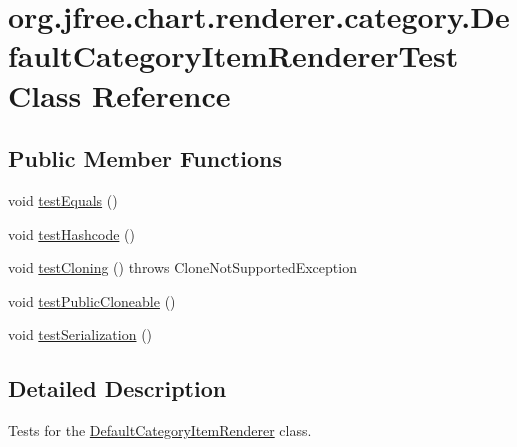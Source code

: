 \hypertarget{classorg_1_1jfree_1_1chart_1_1renderer_1_1category_1_1_default_category_item_renderer_test}{}\section{org.\+jfree.\+chart.\+renderer.\+category.\+Default\+Category\+Item\+Renderer\+Test Class Reference}
\label{classorg_1_1jfree_1_1chart_1_1renderer_1_1category_1_1_default_category_item_renderer_test}
\subsection*{Public Member Functions}
\begin{DoxyCompactItemize}
\item 
void \mbox{\hyperlink{classorg_1_1jfree_1_1chart_1_1renderer_1_1category_1_1_default_category_item_renderer_test_acaabec034fa906c7d3f5dd6e097b3b64}{test\+Equals}} ()
\item 
void \mbox{\hyperlink{classorg_1_1jfree_1_1chart_1_1renderer_1_1category_1_1_default_category_item_renderer_test_a5b9e2341da9ca5eb728088289b6e15ea}{test\+Hashcode}} ()
\item 
void \mbox{\hyperlink{classorg_1_1jfree_1_1chart_1_1renderer_1_1category_1_1_default_category_item_renderer_test_ac8b37a3f9282264afff95c38f85e3f31}{test\+Cloning}} ()  throws Clone\+Not\+Supported\+Exception 
\item 
void \mbox{\hyperlink{classorg_1_1jfree_1_1chart_1_1renderer_1_1category_1_1_default_category_item_renderer_test_ad69db2d67c1d41b42a90aa939256a3ef}{test\+Public\+Cloneable}} ()
\item 
void \mbox{\hyperlink{classorg_1_1jfree_1_1chart_1_1renderer_1_1category_1_1_default_category_item_renderer_test_afa12874cb027aa8632dc9d7b8a9303d2}{test\+Serialization}} ()
\end{DoxyCompactItemize}


\subsection{Detailed Description}
Tests for the \mbox{\hyperlink{classorg_1_1jfree_1_1chart_1_1renderer_1_1category_1_1_default_category_item_renderer}{Default\+Category\+Item\+Renderer}} class. 

